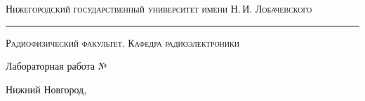 \begin{titlepage}

\begin{center}

{\small\textsc{Нижегородский государственный университет имени Н.\,И. Лобачевского}}
\vskip 1pt \hrule \vskip 3pt
{\small\textsc{Радиофизический факультет. Кафедра радиоэлектроники}}



\vfill

{\Large Лабораторная работа №\labnumber\vskip 12pt\bfseries \labtheme}
	
\end{center}

\vfill
		

\begin{center}
	Нижний Новгород, \the\year
\end{center}

\end{titlepage}

